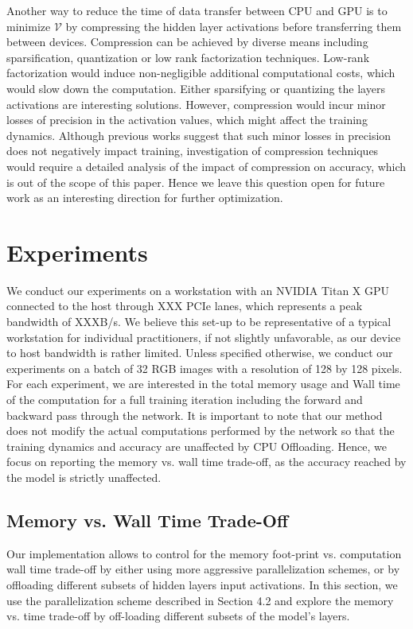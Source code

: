 \documentclass[11pt,onecolumn]{article}
\begin{document}
Another way to reduce the time of data transfer between CPU and GPU is to minimize 
$\mathcal{V}$ by compressing the hidden layer activations 
before transferring them between devices.
Compression can be achieved by diverse means including sparsification, 
quantization or low rank factorization techniques.
Low-rank factorization would induce non-negligible additional computational costs, 
which would slow down the computation.
Either sparsifying or quantizing the layers activations are interesting solutions.
However, compression would incur minor losses of precision in the activation values,
which might affect the training dynamics.
Although previous works suggest that such minor losses in precision does not negatively impact training,
investigation of compression techniques would require a detailed analysis 
of the impact of compression on accuracy, which is out of the scope of this paper.
Hence we leave this question open for future work as an interesting direction for further optimization.

\section{Experiments}

We conduct our experiments on a workstation with an NVIDIA Titan X GPU connected 
to the host through XXX PCIe lanes, which represents a peak bandwidth of XXXB/s.
We believe this set-up to be representative of a typical workstation for individual practitioners, 
if not slightly unfavorable, as our device to host bandwidth is rather limited.
Unless specified otherwise, we conduct our experiments on a batch of 32 RGB images 
with a resolution of 128 by 128 pixels.
For each experiment, we are interested in the total memory usage and Wall time of
the computation for a full training iteration including the forward and backward pass through the network.
It is important to note that our method does not modify the actual computations performed
by the network so that the training dynamics and accuracy are unaffected by CPU Offloading.
Hence, we focus on reporting the memory vs. wall time trade-off,
 as the accuracy reached by the model is strictly unaffected.

\subsection{Memory vs. Wall Time Trade-Off}

Our implementation allows to control for the memory foot-print vs. computation wall time trade-off by 
either using more aggressive parallelization schemes,
or by offloading different subsets of hidden layers input activations.
In this section, we use the parallelization scheme described in Section 4.2
and explore the memory vs. time trade-off by off-loading different subsets of the model's layers.
\end{document}
